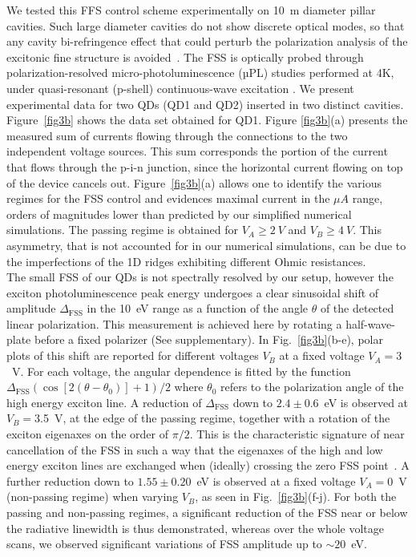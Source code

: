 \documentclass[article,twocolumn, superscriptaddress, 10pt, nofootinbib]{revtex4-1}%
\begin{document}
We tested this FFS control scheme experimentally on 10~\textmu m diameter pillar cavities. Such large diameter cavities do not show discrete optical modes, so that any cavity bi-refringence effect that could perturb the polarization analysis of the excitonic fine structure is avoided~\cite{strainpillar}.
The  FSS is optically probed through polarization-resolved micro-photoluminescence (µPL) studies performed at 4K, under quasi-resonant (p-shell) continuous-wave excitation \cite{Gazzano2013}. We present experimental data for two QDs (QD1 and QD2) inserted in two distinct cavities. Figure~\ref{fig3b} shows the data set obtained for QD1. Figure \ref{fig3b}(a) presents the measured sum of currents {flowing through the connections to} the two independent voltage sources. This {sum corresponds the portion of the current that flows through the p-i-n junction, since the horizontal current flowing on top of the device cancels out}.  Figure~\ref{fig3b}(a) allows one to identify the various regimes for the FSS control {and evidences maximal current in the $\mu A$ range, orders of magnitudes lower than predicted by our simplified  numerical simulations}. The passing regime is obtained for $V_A \ge 2~V$ and $V_B \ge 4~V$.  
 This asymmetry, that is not accounted for in our numerical simulations, can be due to the imperfections of the 1D ridges  exhibiting different {Ohmic} resistances.\\ 
 
 The small FSS of our QDs is not spectrally resolved by our setup, however the exciton  photoluminescence peak energy undergoes a clear sinusoidal shift of amplitude $\Delta_\text{FSS}$ in the 10~\textmu eV range as a function of the angle $\theta$ of the detected linear polarization. This measurement is achieved    here by rotating  a half-wave-plate  before a fixed polarizer ({See supplementary}). In Fig.~\ref{fig3b}(b-e),   polar plots  of this shift are reported  for  different voltages $V_B$ at a fixed voltage $V_A=3$~V. For each voltage, the  angular dependence is fitted by the function $\Delta_\text{FSS}( \cos[2(\theta-\theta_0)]+1)/2$ where $\theta_0$ refers to the polarization angle of the high energy exciton line. A reduction of   $\Delta_\text{FSS}$ down to {$ 2.4\pm 0.6 $~\textmu eV} is observed at $V_B=$3.5~V, at the edge of the passing regime,  together with a rotation of the exciton eigenaxes on the order  of $\pi/2$. This is the characteristic signature of near cancellation of the FSS in such a way that the eigenaxes of the high and low energy exciton lines are exchanged when (ideally) crossing the zero FSS point~\cite{bennett2012,TrottaUniversalRecovery}.
 A further reduction {down to $1.55\pm 0.20$~\textmu eV} is observed  at a fixed voltage $V_A=0$~V (non-passing regime) when varying $V_B$, as seen in Fig.~\ref{fig3b}(f-j). For both the  passing   and non-passing regimes, a  significant reduction of the FSS near or below the radiative linewidth is thus demonstrated, whereas over the whole voltage scans, we  observed significant variations of  FSS amplitude up to $\sim 20$~\textmu eV. 
  
\end{document}
